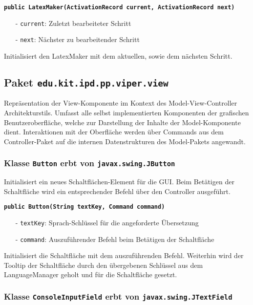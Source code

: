 \documentclass[parskip=full,11pt,twoside]{scrartcl}
\begin{document}
\textbf{\texttt{public LatexMaker(ActivationRecord current, ActivationRecord next)}}
\begin{itemize}[noitemsep]
	\item[-] \texttt{current}: Zuletzt bearbeiteter Schritt
    \item[-] \texttt{next}: Nächster zu bearbeitender Schritt
\end{itemize}
Initialisiert den LatexMaker mit dem aktuellen, sowie dem nächsten Schritt.

\newpage
\subsection{Paket \texttt{edu.kit.ipd.pp.viper.view}}

Repräsentation der View-Komponente im Kontext des Model-View-Controller Architekturstils. Umfasst alle selbst implementierten Komponenten der grafischen Benutzeroberfläche, welche zur Darstellung der Inhalte der Model-Komponente dient. Interaktionen mit der Oberfläche werden über Commands aus dem Controller-Paket auf die internen Datenstrukturen des Model-Pakets angewandt.

\newpage
\newpage

\subsubsection{Klasse \texttt{Button} erbt von \texttt{javax.swing.JButton}}

Initialisiert ein neues Schaltflächen-Element für die GUI. Beim Betätigen der Schaltfläche wird ein entsprechender Befehl über den Controller ausgeführt.

\textbf{\texttt{public Button(String textKey, Command command)}}
\begin{itemize}[noitemsep]
	\item[-] \texttt{textKey}: Sprach-Schlüssel für die angeforderte Übersetzung
	\item[-] \texttt{command}: Auszuführender Befehl beim Betätigen der Schaltfläche
\end{itemize}
Initialisiert die Schaltfläche mit dem auszuführenden Befehl. Weiterhin wird der Tooltip der Schaltfläche durch den übergebenen Schlüssel aus dem LanguageManager geholt und für die Schaltfläche gesetzt.

\subsubsection{Klasse \texttt{ConsoleInputField} erbt von \texttt{javax.swing.JTextField}}
\end{document}
